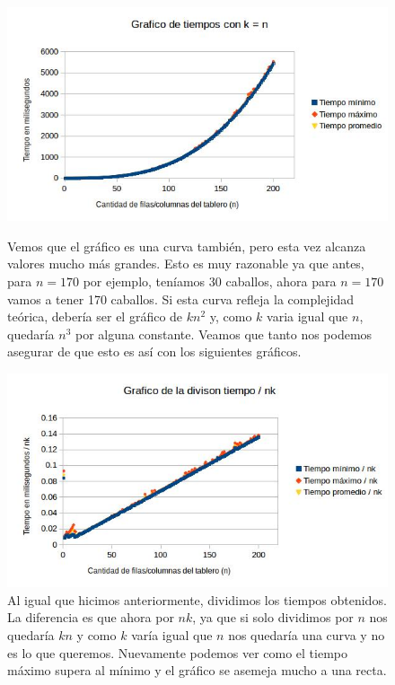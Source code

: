 \documentclass[a4paper]{article}
\begin{document}
\begin{figure}[h!]
\centering
\includegraphics[width=\textwidth]{conjBcurva.jpg}\caption{Vemos que el gráfico es una curva también, pero esta vez alcanza valores mucho más grandes. Esto es muy razonable ya que antes, para $n = 170$ por ejemplo, teníamos 30 caballos, ahora para $n = 170$ vamos a tener 170 caballos. Si esta curva refleja la complejidad teórica, debería ser el gráfico de $kn^2$ y, como $k$ varia igual que $n$, quedaría $n^3$ por alguna constante. Veamos que tanto nos podemos asegurar de que esto es así con los siguientes gráficos.}
\centering
\includegraphics[width=\textwidth]{conjBlinea.jpg}\caption{Al igual que hicimos anteriormente, dividimos los tiempos obtenidos. La diferencia es que ahora por $nk$, ya que si solo dividimos por $n$ nos quedaría $kn$ y como $k$ varía igual que $n$ nos quedaría una curva y no es lo que queremos. Nuevamente podemos ver como el tiempo máximo supera al mínimo y el gráfico se asemeja mucho a una recta.}
\end{figure}
\end{document}

